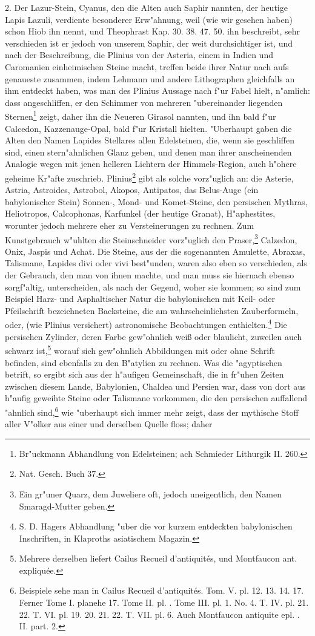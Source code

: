 \documentclass[a4paper, 11pt, oneside, polutonikogreek, german]{article}
\begin{document}
2. Der Lazur-Stein, Cyanus, den die Alten auch Saphir nannten, der heutige Lapis Lazuli, verdiente besonderer Erw"ahnung, weil (wie wir gesehen haben) schon Hiob ihn nennt, und Theophrast Kap. 30. 38. 47. 50. ihn beschreibt, sehr verschieden ist er jedoch von unserem Saphir, der weit durchsichtiger ist, und nach der Beschreibung, die Plinius von der Asteria, einem in Indien und Caromanien einheimischen Steine macht, treffen beide ihrer Natur nach aufs genaueste zusammen, indem Lehmann und andere Lithographen gleichfalls an ihm entdeckt haben, was man des Plinius Aussage nach f"ur Fabel hielt, n"amlich: dass angeschliffen, er den Schimmer von mehreren "ubereinander liegenden Sternen\footnote{Br"uckmann Abhandlung von Edelsteinen; ach Schmieder Lithurgik II. 260.} zeigt, daher ihn die Neueren Girasol nannten, und ihn bald f"ur Calcedon, Kazzenauge-Opal, bald f"ur Kristall hielten. "Uberhaupt gaben die Alten den Namen Lapides Stellares allen Edelsteinen, die, wenn sie geschliffen sind, einen stern"ahnlichen Glanz geben, und denen man ihrer anscheinenden Analogie wegen mit jenen helleren Lichtern der Himmels-Region, auch h"ohere geheime Kr"afte zuschrieb. Plinius\footnote{Nat. Gesch. Buch 37.} gibt als solche vorz"uglich an: die Asterie, Astria, Astroides, Astrobol, Akopos, Antipatos, das Belus-Auge (ein babylonischer Stein) Sonnen-, Mond- und Komet-Steine, den persischen Mythras, Heliotropos, Calcophonas, Karfunkel (der heutige Granat), H"aphestites, worunter jedoch mehrere eher zu Versteinerungen zu rechnen. Zum Kunstgebrauch w"uhlten die Steinschneider vorz"uglich den Praser,\footnote{Ein gr"uner Quarz, dem Juweliere oft, jedoch uneigentlich, den Namen Smaragd-Mutter geben.} Calzedon, Onix, Jaspis und Achat. Die Steine, aus der die sogenannten Amulette, Abraxas, Talismane, Lapides divi oder vivi best"unden, waren also eben so verschieden, als der Gebrauch, den man von ihnen machte, und man muss sie hiernach ebenso sorgf"altig, unterscheiden, als nach der Gegend, woher sie kommen; so sind zum Beispiel Harz- und Asphaltischer Natur die babylonischen mit Keil- oder Pfeilschrift bezeichneten Backsteine, die am wahrscheinlichsten Zauberformeln, oder, (wie Plinius versichert) astronomische Beobachtungen enthielten.\footnote{S. D. Hagers Abhandlung "uber die vor kurzem entdeckten babylonischen Inschriften, in Klaproths asiatischem Magazin.} Die persischen Zylinder, deren Farbe gew"ohnlich weiß oder blaulicht, zuweilen auch schwarz ist,\footnote{Mehrere derselben liefert Cailus Recueil d'antiquités, und Montfaucon ant. expliquée.} worauf sich gew"ohnlich Abbildungen mit oder ohne Schrift befinden, sind ebenfalls zu den B"atylien zu rechnen. Was die "agyptischen betrift, so ergibt sich aus der h"aufigen Gemeinschaft, die in fr"uhen Zeiten zwischen diesem Lande, Babylonien, Chaldea und Persien war, dass von dort aus h"aufig geweihte Steine oder Talismane vorkommen, die den persischen auffallend "ahnlich sind,\footnote{Beispiele sehe man in Cailus Recueil d'antiquités. Tom. V. pl. 12. 13. 14. 17. Ferner Tome I. planehe 17. Tome II. pl. . Tome III. pl. 1. No. 4. T. IV. pl. 21. 22. T. VI. pl. 19. 20. 21. 22. T. VII. pl. 6. Auch Montfaucon antiquite epl. . II. part. 2.} wie "uberhaupt sich immer mehr zeigt, dass der mythische Stoff aller V"olker aus einer und derselben Quelle floss; daher 
\end{document}
